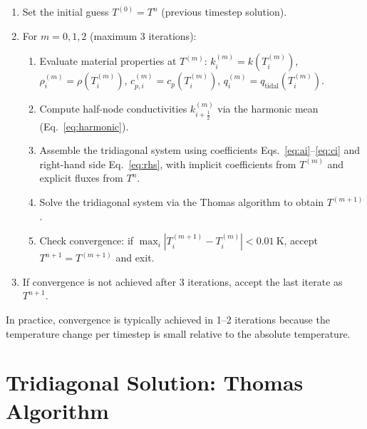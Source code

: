 \documentclass[11pt,a4paper]{article}
\newcommand{\half}{\tfrac{1}{2}}
\begin{document}
\begin{enumerate}[leftmargin=2em]
\item Set the initial guess $T^{(0)} = T^n$ (previous timestep solution).
\item For $m = 0, 1, 2$ (maximum 3 iterations):
  \begin{enumerate}
  \item Evaluate material properties at $T^{(m)}$:
    $k^{(m)}_i = k(T^{(m)}_i)$,
    $\rho^{(m)}_i = \rho(T^{(m)}_i)$,
    $c_{p,i}^{(m)} = c_p(T^{(m)}_i)$,
    $q^{(m)}_i = q_{\mathrm{tidal}}(T^{(m)}_i)$.
  \item Compute half-node conductivities $k^{(m)}_{i+\half}$ via the
        harmonic mean (Eq.~\ref{eq:harmonic}).
  \item Assemble the tridiagonal system using coefficients
        Eqs.~\ref{eq:ai}--\ref{eq:ci} and right-hand side Eq.~\ref{eq:rhs},
        with implicit coefficients from $T^{(m)}$ and explicit
        fluxes from $T^n$.
  \item Solve the tridiagonal system via the Thomas algorithm to obtain
        $T^{(m+1)}$.
  \item Check convergence: if
        $\max_i |T^{(m+1)}_i - T^{(m)}_i| < \SI{0.01}{\kelvin}$,
        accept $T^{n+1} = T^{(m+1)}$ and exit.
  \end{enumerate}
\item If convergence is not achieved after 3 iterations, accept the
      last iterate as $T^{n+1}$.
\end{enumerate}

In practice, convergence is typically achieved in 1--2 iterations
because the temperature change per timestep is small relative to the
absolute temperature.

\section{Tridiagonal Solution: Thomas Algorithm}
\label{sec:thomas}
\end{document}
